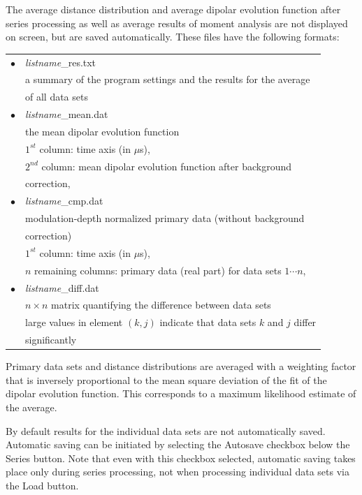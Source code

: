\documentclass{article}
\begin{document}
The average distance distribution and average dipolar evolution function after series processing as well as average results of moment analysis are not displayed on screen, but are saved automatically. These files have the following formats:

\begin{tabular}{ll}
\noalign{\smallskip}
$\bullet$ & {\ttfamily \emph{listname}\_res.txt} \\
& a summary of the program settings and the results for the average \\
& of all data sets \\
$\bullet$ & {\ttfamily \emph{listname}\_mean.dat} \\
& the mean dipolar evolution function \\
& $1^{st}$ column: time axis (in $\mu$s), \\
& $2^{nd}$ column: mean dipolar evolution function after background \\
& correction, \\
$\bullet$ & {\ttfamily \emph{listname}\_cmp.dat} \\
& modulation-depth normalized primary data (without background \\
& correction) \\
& $1^{st}$ column: time axis (in $\mu$s), \\
& $n$ remaining columns: primary data (real part) for data sets $1\cdots n$, \\
$\bullet$ & {\ttfamily \emph{listname}\_diff.dat} \\
& $n \times n$ matrix quantifying the difference between data sets \\
& large values in element $(k,j)$ indicate that data sets $k$ and $j$ differ \\
& significantly \\
\end{tabular}

Primary data sets and distance distributions are averaged with a weighting factor that is inversely proportional to the mean square deviation of the fit of the dipolar evolution function. This corresponds to a maximum likelihood estimate of the average.

By default results for the individual data sets are not automatically saved. Automatic saving can be initiated by selecting the {\ttfamily Autosave} checkbox below the {\ttfamily Series} button. Note that even with this checkbox selected, automatic saving takes place only during series processing, not when processing individual data sets via the {\ttfamily Load} button.
\end{document}
